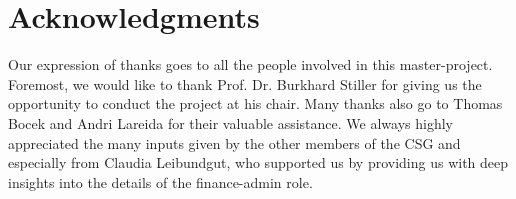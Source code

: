 \chapter*{Acknowledgments}

Our expression of thanks goes to all the people involved in this master-project. Foremost, we would like to thank Prof. Dr. Burkhard Stiller for giving us the opportunity to conduct the project at his chair. Many thanks also go to Thomas Bocek and Andri Lareida for their valuable assistance. We always highly appreciated the many inputs given by the other members of the CSG and especially from Claudia Leibundgut, who supported us by providing us with deep insights into the details of the finance-admin role.